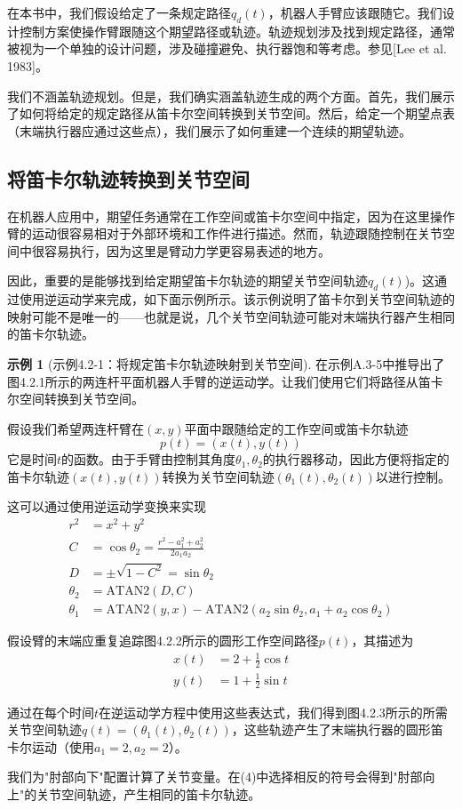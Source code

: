 \documentclass[UTF8]{ctexart}
\theoremstyle{definition}
\newtheorem{example}{示例}[section]
\newcommand{\ATAN}{\mathrm{ATAN2}}
\begin{document}
在本书中，我们假设给定了一条规定路径$q_d(t)$，机器人手臂应该跟随它。我们设计控制方案使操作臂跟随这个期望路径或轨迹。轨迹规划涉及找到规定路径，通常被视为一个单独的设计问题，涉及碰撞避免、执行器饱和等考虑。参见[Lee et al. 1983]。

我们不涵盖轨迹规划。但是，我们确实涵盖轨迹生成的两个方面。首先，我们展示了如何将给定的规定路径从笛卡尔空间转换到关节空间。然后，给定一个期望点表（末端执行器应通过这些点），我们展示了如何重建一个连续的期望轨迹。

\subsection{将笛卡尔轨迹转换到关节空间}

在机器人应用中，期望任务通常在工作空间或笛卡尔空间中指定，因为在这里操作臂的运动很容易相对于外部环境和工作件进行描述。然而，轨迹跟随控制在关节空间中很容易执行，因为这里是臂动力学更容易表述的地方。

因此，重要的是能够找到给定期望笛卡尔轨迹的期望关节空间轨迹$q_d(t)$)。这通过使用逆运动学来完成，如下面示例所示。该示例说明了笛卡尔到关节空间轨迹的映射可能不是唯一的——也就是说，几个关节空间轨迹可能对末端执行器产生相同的笛卡尔轨迹。

\begin{example}[示例4.2-1：将规定笛卡尔轨迹映射到关节空间]
在示例A.3-5中推导出了图4.2.1所示的两连杆平面机器人手臂的逆运动学。让我们使用它们将路径从笛卡尔空间转换到关节空间。

假设我们希望两连杆臂在$(x, y)$平面中跟随给定的工作空间或笛卡尔轨迹
\begin{equation*}
    p(t) = (x(t), y(t))
\end{equation*}
它是时间$t$的函数。由于手臂由控制其角度$\theta_1, \theta_2$的执行器移动，因此方便将指定的笛卡尔轨迹$(x(t), y(t))$转换为关节空间轨迹$(\theta_1(t), \theta_2(t))$以进行控制。

这可以通过使用逆运动学变换来实现
\begin{align*}
    r^2 &= x^2 + y^2 \\
    C &= \cos\theta_2 = \frac{r^2 - a_1^2 + a_2^2}{2a_1a_2} \\
    D &= \pm\sqrt{1 - C^2} = \sin\theta_2 \\
    \theta_2 &= \ATAN(D, C) \\
    \theta_1 &= \ATAN(y, x) - \ATAN(a_2\sin\theta_2, a_1 + a_2\cos\theta_2)
\end{align*}

假设臂的末端应重复追踪图4.2.2所示的圆形工作空间路径$p(t)$，其描述为
\begin{align*}
    x(t) &= 2 + \frac{1}{2}\cos t \\
    y(t) &= 1 + \frac{1}{2}\sin t
\end{align*}

通过在每个时间$t$在逆运动学方程中使用这些表达式，我们得到图4.2.3所示的所需关节空间轨迹$q(t) = (\theta_1(t), \theta_2(t))$，这些轨迹产生了末端执行器的圆形笛卡尔运动（使用$a_1 = 2, a_2 = 2$）。

我们为"肘部向下"配置计算了关节变量。在(4)中选择相反的符号会得到"肘部向上"的关节空间轨迹，产生相同的笛卡尔轨迹。
\end{example}
\end{document}
